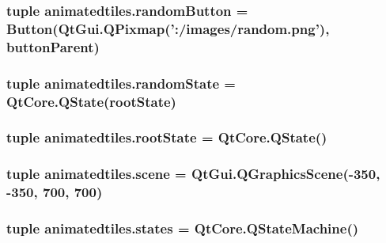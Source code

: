 \subsubsection[{random\+Button}]{\setlength{\rightskip}{0pt plus 5cm}tuple animatedtiles.\+random\+Button = {\bf Button}(Qt\+Gui.\+Q\+Pixmap('\+:/images/random.\+png'), {\bf button\+Parent})}\label{namespaceanimatedtiles_ac89ca6d7bc45ebf366615df1e4cc7540}
\hypertarget{namespaceanimatedtiles_a729bc78eefb36301d6c31cfd7f792c4d}{}
\subsubsection[{random\+State}]{\setlength{\rightskip}{0pt plus 5cm}tuple animatedtiles.\+random\+State = Qt\+Core.\+Q\+State({\bf root\+State})}\label{namespaceanimatedtiles_a729bc78eefb36301d6c31cfd7f792c4d}
\hypertarget{namespaceanimatedtiles_a873376be67b1d220a932641f09deeef0}{}
\subsubsection[{root\+State}]{\setlength{\rightskip}{0pt plus 5cm}tuple animatedtiles.\+root\+State = Qt\+Core.\+Q\+State()}\label{namespaceanimatedtiles_a873376be67b1d220a932641f09deeef0}
\hypertarget{namespaceanimatedtiles_aeca35dab2ca795f6e6dabf76a4797ef0}{}
\subsubsection[{scene}]{\setlength{\rightskip}{0pt plus 5cm}tuple animatedtiles.\+scene = Qt\+Gui.\+Q\+Graphics\+Scene(-\/350, -\/350, 700, 700)}\label{namespaceanimatedtiles_aeca35dab2ca795f6e6dabf76a4797ef0}
\hypertarget{namespaceanimatedtiles_a205ec3f5950b4102e125480af62e56e2}{}
\subsubsection[{states}]{\setlength{\rightskip}{0pt plus 5cm}tuple animatedtiles.\+states = Qt\+Core.\+Q\+State\+Machine()}\label{namespaceanimatedtiles_a205ec3f5950b4102e125480af62e56e2}
\hypertarget{namespaceanimatedtiles_abb2947b32ad817e5c844b47f587e6b3f}{}
